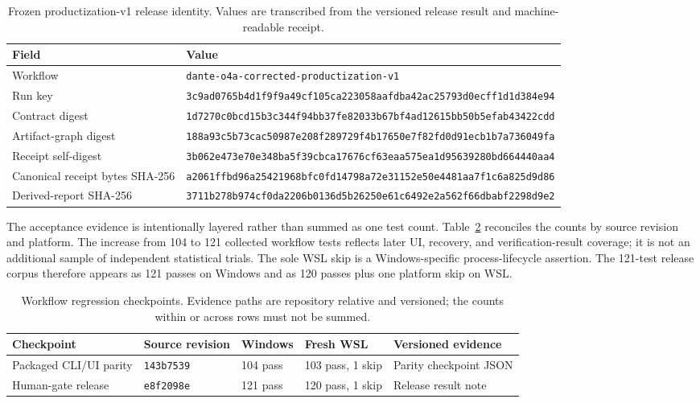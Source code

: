 \documentclass[aps,prd,twocolumn,superscriptaddress,nofootinbib,amsmath,amssymb,floatfix,10pt]{revtex4-2}
\begin{document}
\begin{table}[t]
\caption{Frozen productization-v1 release identity.  Values are transcribed
from the versioned release result and machine-readable receipt.}
\label{tab:identity}
\begin{ruledtabular}
\begin{tabular}{ll}
Field & Value \\
\hline
Workflow & \texttt{dante-o4a-corrected-productization-v1} \\
Run key & \texttt{3c9ad0765b4d1f9f9a49cf105ca223058aafdba42ac25793d0ecff1d1d384e94} \\
Contract digest & \texttt{1d7270c0bcd15b3c344f94bb37fe82033b67bf4ad12615bb50b5efab43422cdd} \\
Artifact-graph digest & \texttt{188a93c5b73cac50987e208f289729f4b17650e7f82fd0d91ecb1b7a736049fa} \\
Receipt self-digest & \texttt{3b062e473e70e348ba5f39cbca17676cf63eaa575ea1d95639280bd664440aa4} \\
Canonical receipt bytes SHA-256 & \texttt{a2061ffbd96a25421968bfc0fd14798a72e31152e50e4481aa7f1c6a825d9d86} \\
Derived-report SHA-256 & \texttt{3711b278b974cf0da2206b0136d5b26250e61c6492e2a562f66dbabf2298d9e2} \\
\end{tabular}
\end{ruledtabular}
\end{table}

The acceptance evidence is intentionally layered rather than summed as one
test count.  Table~\ref{tab:tests} reconciles the counts by source revision and
platform.  The increase from 104 to 121 collected workflow tests reflects later
UI, recovery, and verification-result coverage; it is not an additional sample
of independent statistical trials.  The sole WSL skip is a Windows-specific
process-lifecycle assertion.  The 121-test release corpus therefore appears as
121 passes on Windows and as 120 passes plus one platform skip on WSL.

\begin{table}[t]
\caption{Workflow regression checkpoints.  Evidence paths are repository
relative and versioned; the counts within or across rows must not be summed.}
\label{tab:tests}
\begin{ruledtabular}
\begin{tabular}{p{}p{}p{}p{}p{}}
Checkpoint & Source revision & Windows & Fresh WSL & Versioned evidence \\
\hline
Packaged CLI/UI parity & \texttt{143b7539} & 104 pass & 103 pass, 1 skip &
Parity checkpoint JSON \\
Human-gate release & \texttt{e8f2098e} & 121 pass & 120 pass, 1 skip &
Release result note \\
\end{tabular}
\end{ruledtabular}
\end{table}
\end{document}
